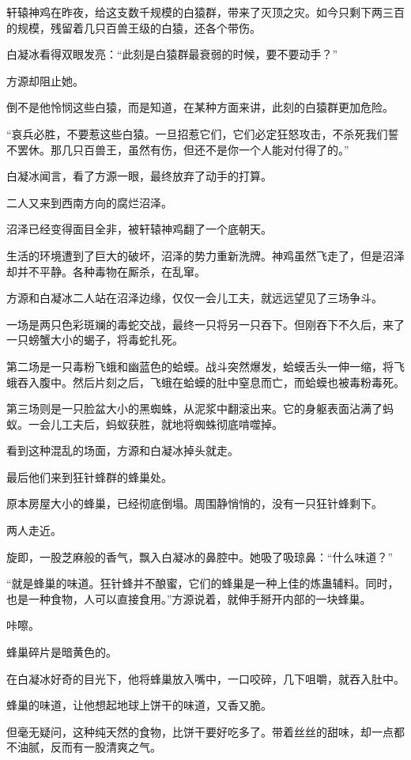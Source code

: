 \begin{this_body}
轩辕神鸡在昨夜，给这支数千规模的白猿群，带来了灭顶之灾。如今只剩下两三百的规模，残留着几只百兽王级的白猿，还各个带伤。

白凝冰看得双眼发亮：“此刻是白猿群最衰弱的时候，要不要动手？”

方源却阻止她。

倒不是他怜悯这些白猿，而是知道，在某种方面来讲，此刻的白猿群更加危险。

“哀兵必胜，不要惹这些白猿。一旦招惹它们，它们必定狂怒攻击，不杀死我们誓不罢休。那几只百兽王，虽然有伤，但还不是你一个人能对付得了的。”

白凝冰闻言，看了方源一眼，最终放弃了动手的打算。

二人又来到西南方向的腐烂沼泽。

沼泽已经变得面目全非，被轩辕神鸡翻了一个底朝天。

生活的环境遭到了巨大的破坏，沼泽的势力重新洗牌。神鸡虽然飞走了，但是沼泽却并不平静。各种毒物在厮杀，在乱窜。

方源和白凝冰二人站在沼泽边缘，仅仅一会儿工夫，就远远望见了三场争斗。

一场是两只色彩斑斓的毒蛇交战，最终一只将另一只吞下。但刚吞下不久后，来了一只螃蟹大小的蝎子，将毒蛇扎死。

第二场是一只毒粉飞蛾和幽蓝色的蛤蟆。战斗突然爆发，蛤蟆舌头一伸一缩，将飞蛾吞入腹中。然后片刻之后，飞蛾在蛤蟆的肚中窒息而亡，而蛤蟆也被毒粉毒死。

第三场则是一只脸盆大小的黑蜘蛛，从泥浆中翻滚出来。它的身躯表面沾满了蚂蚁。一会儿工夫后，蚂蚁获胜，就地将蜘蛛彻底啃噬掉。

看到这种混乱的场面，方源和白凝冰掉头就走。

最后他们来到狂针蜂群的蜂巢处。

原本房屋大小的蜂巢，已经彻底倒塌。周围静悄悄的，没有一只狂针蜂剩下。

两人走近。

旋即，一股芝麻般的香气，飘入白凝冰的鼻腔中。她吸了吸琼鼻：“什么味道？”

“就是蜂巢的味道。狂针蜂并不酿蜜，它们的蜂巢是一种上佳的炼蛊辅料。同时，也是一种食物，人可以直接食用。”方源说着，就伸手掰开内部的一块蜂巢。

咔嚓。

蜂巢碎片是暗黄色的。

在白凝冰好奇的目光下，他将蜂巢放入嘴中，一口咬碎，几下咀嚼，就吞入肚中。

蜂巢的味道，让他想起地球上饼干的味道，又香又脆。

但毫无疑问，这种纯天然的食物，比饼干要好吃多了。带着丝丝的甜味，却一点都不油腻，反而有一股清爽之气。


\end{this_body}
